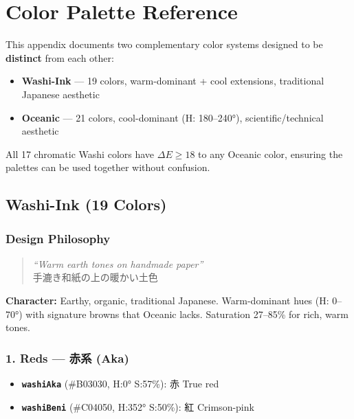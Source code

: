 
\chapter{Color Palette Reference}\label{app:color}

This appendix documents two complementary color systems designed to be \textbf{distinct} from each other:

\begin{itemize}
    \item \textbf{Washi-Ink} --- 19 colors, warm-dominant + cool extensions, traditional Japanese aesthetic
    \item \textbf{Oceanic} --- 21 colors, cool-dominant (H: 180--240°), scientific/technical aesthetic
\end{itemize}

\noindent All 17 chromatic Washi colors have $\Delta E \geq 18$ to any Oceanic color, ensuring the palettes can be used together without confusion.

\section{Washi-Ink (19 Colors)}

\subsection*{Design Philosophy}

\begin{quote}
    \textit{``Warm earth tones on handmade paper''} \\
    手漉き和紙の上の暖かい土色
\end{quote}

\noindent\textbf{Character:} Earthy, organic, traditional Japanese. Warm-dominant hues (H: 0--70°) with signature browns that Oceanic lacks. Saturation 27--85\% for rich, warm tones.

\subsection*{1. Reds --- 赤系 (Aka)}
\begin{itemize}
    \item \textbf{\texttt{washiAka}} (\#B03030, H:0° S:57\%): 赤 True red
    \item \textbf{\texttt{washiBeni}} (\#C04050, H:352° S:50\%): 紅 Crimson-pink
\end{itemize}

